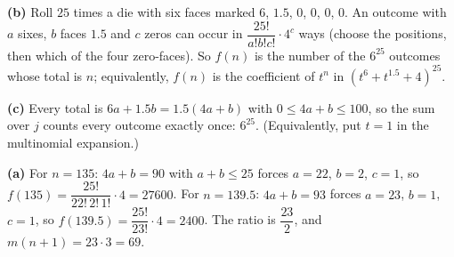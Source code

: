 \textbf{(b)} Roll $25$ times a die with six faces marked $6$, $1.5$, $0$, $0$, $0$, $0$. An outcome with $a$ sixes, $b$ faces $1.5$ and $c$ zeros can occur in $\dfrac{25!}{a!b!c!}\cdot4^c$ ways (choose the positions, then which of the four zero-faces). So $f(n)$ is the number of the $6^{25}$ outcomes whose total is $n$; equivalently, $f(n)$ is the coefficient of $t^n$ in $\left(t^6+t^{1.5}+4\right)^{25}$.

\textbf{(c)} Every total is $6a+1.5b=1.5(4a+b)$ with $0\le4a+b\le100$, so the sum over $j$ counts every outcome exactly once: $6^{25}$. (Equivalently, put $t=1$ in the multinomial expansion.)

\textbf{(a)} For $n=135$: $4a+b=90$ with $a+b\le25$ forces $a=22$, $b=2$, $c=1$, so $f(135)=\dfrac{25!}{22!\,2!\,1!}\cdot4=27600$. For $n=139.5$: $4a+b=93$ forces $a=23$, $b=1$, $c=1$, so $f(139.5)=\dfrac{25!}{23!}\cdot4=2400$. The ratio is $\dfrac{23}{2}$, and $m(n+1)=23\cdot3=\boxed{69}$.
